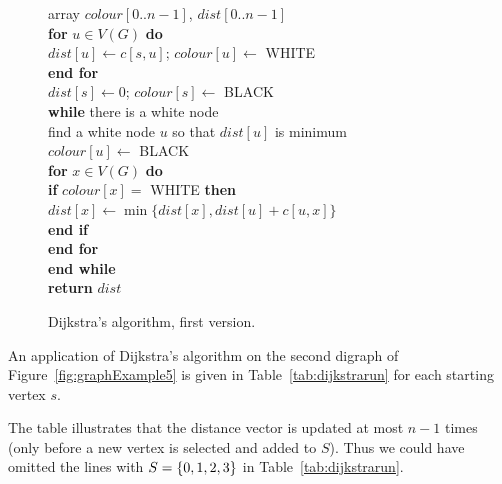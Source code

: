 \begin{figure}
\hspace*{.6in}\begin{minipage}{5in}
{
\> array $colour[0..n-1]$, $dist[0..n-1]$ \\
\> \textbf{for} $u\in V(G)$ \textbf{do} \\
\> \> $dist[u] \gets c[s,u]$; $colour[u] \gets$ WHITE  \\
\> \textbf{end for} \\
\> $dist[s] \gets 0$; $colour[s] \gets $ BLACK\\
\> \textbf{while}  there is a white node  \\
\> \> find a white node $u$ so that $dist[u]$ is minimum\\
\> \> $colour[u] \gets $ BLACK \\
\> \> \textbf{for}  $x \in V(G)$ \textbf{do}\\
\> \> \> \textbf{if} $colour[x] = $ WHITE  \textbf{then} \\
\> \> \> \> $dist[x] \gets \min \{dist[x], dist[u] + c[u,x]\}$\\  
\> \> \> \textbf{end if} \\
\> \> \textbf{end for} \\
\> \textbf{end while} \\
\> \textbf{return} $dist$\\ 
}
\end{minipage}
\caption{Dijkstra's algorithm, first version.}
\label{fig:dijkstra-alg}
\end{figure}


\begin{Example}
\label{eg:dijkstra}
An application of Dijkstra's algorithm on the second digraph
of Figure~\ref{fig:graphExample5} is given in Table~\ref{tab:dijkstrarun}
for each starting vertex $s$.

The table illustrates that the distance vector is updated at 
most $n - 1$ times (only before a new vertex is selected and added to $S$). 
Thus we could have omitted the lines with $S=\mbox{$\{0,1,2,3\}$}$ in 
Table~\ref{tab:dijkstrarun}.
\end{Example}

